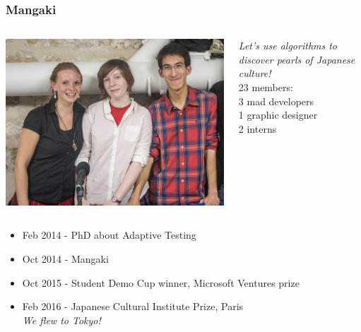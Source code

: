 \documentclass[handout]{beamer}
\begin{document}
\begin{frame}
  \frametitle{Mangaki}
  \begin{columns}
  \begin{column}{0.5\textwidth}
    \includegraphics[width=\textwidth]{figures/trio.jpg}
  \end{column}
  \begin{column}{0.5\textwidth}
    {\em Let's use algorithms to discover pearls of Japanese culture!}\\[5mm]
    23 members:\\\hspace{7mm} 3 mad developers\\\hspace{14mm} 1 graphic designer\\\hspace{21mm} 2 interns
  \end{column}
  \end{columns}
  \vspace{2mm}
  \begin{itemize}
  \item Feb 2014 - PhD about Adaptive Testing
  \item Oct 2014 - \alert{Mangaki}
  \item Oct 2015 - Student Demo Cup winner, Microsoft Ventures prize
  \item Feb 2016 - Japanese Cultural Institute Prize, Paris\\[1mm]\pause\hfill\small\em We flew to Tokyo!
  \end{itemize}
\end{frame}
\end{document}
